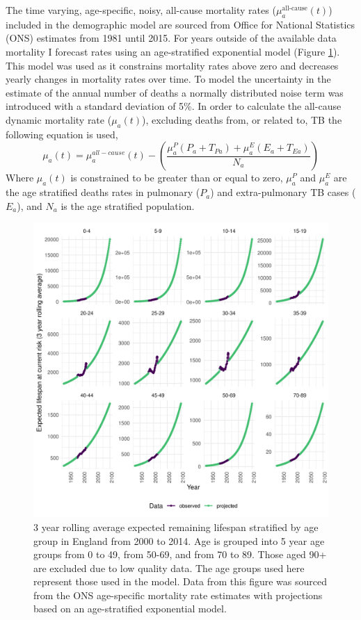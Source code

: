\documentclass[11pt,twoside]{bristolthesis}
\begin{document}
  The time varying, age-specific, noisy, all-cause mortality rates (\(\mu^{\text{all-cause}}_a(t)\)) included in the demographic model are sourced from Office for National Statistics (ONS) estimates from 1981 until 2015. For years outside of the available data mortality I forecast rates using an age-stratified exponential model (Figure \ref{fig:mortality-england}). This model was used as it constrains mortality rates above zero and decreases yearly changes in mortality rates over time. To model the uncertainty in the estimate of the annual number of deaths a normally distributed noise term was introduced with a standard deviation of 5\%. In order to calculate the all-cause dynamic mortality rate (\(\mu_a(t)\)), excluding deaths from, or related to, TB the following equation is used,
  \begin{equation}
  \mu_a(t) = \mu^{all-cause}_a(t) - \left(\frac{\mu^P_a(P_a + T_{Pa}) + \mu^E_a(E_a + T_{Ea})}{N_a}\right)
    \label{eq:adjusted-mortality}
  \end{equation}
  Where \(\mu_a(t)\) is constrained to be greater than or equal to zero, \(\mu^{P}_a\) and \(\mu^E_a\) are the age stratified deaths rates in pulmonary (\(P_a\)) and extra-pulmonary TB cases (\(E_a\)), and \(N_a\) is the age stratified population.
  \begin{figure}
  
  {\centering \includegraphics[width=0.8\linewidth,]{chapters/model-development/resources/figure/mortality} 
  
  }
  
  \caption[3 year rolling average expected remaining lifespan stratified by age group in England from 2000 to 2014.]{3 year rolling average expected remaining lifespan stratified by age group in England from 2000 to 2014. Age is grouped into 5 year age groups from 0 to 49, from 50-69, and from 70 to 89. Those aged 90+ are excluded due to low quality data. The age groups used here represent those used in the model. Data from this figure was sourced from the ONS age-specific mortality rate estimates with projections based on an age-stratified exponential model.}\label{fig:mortality-england}
  \end{figure}
\end{document}
